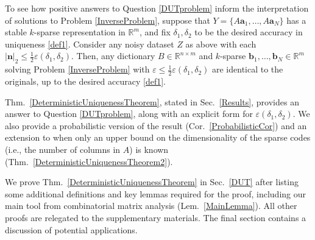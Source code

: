 \documentclass[journal, twocolumn]{IEEEtran}
\begin{document}
To see how positive answers to Question \ref{DUTproblem} inform the interpretation of solutions to Problem \ref{InverseProblem}, suppose that \mbox{$Y = \{A \mathbf{a}_1, \ldots, A\mathbf{a}_N\}$} has a stable $k$-sparse representation in $\mathbb R^m$, and fix $\delta_1, \delta_2$ to be the desired accuracy in uniqueness \eqref{def1}.  Consider any noisy dataset $Z$ as above with each $|\mathbf{n}|_2 \leq \frac{1}{2} \varepsilon(\delta_1, \delta_2)$.  Then, any  dictionary $B \in \mathbb{R}^{n \times m}$ and $k$-sparse $\mathbf{b}_1, \ldots, \mathbf{b}_N \in \mathbb{R}^m$ solving Problem \ref{InverseProblem} with $\varepsilon \leq \frac{1}{2} \varepsilon(\delta_1, \delta_2)$ are identical to the originals, up to the desired accuracy \eqref{def1}.
%
%
%
%

Thm.~\ref{DeterministicUniquenessTheorem}, stated in Sec.~\ref{Results}, provides an answer to Question \ref{DUTproblem}, along with an explicit form for $\varepsilon(\delta_1, \delta_2)$.  We also provide a probabilistic version of the result (Cor.~\ref{ProbabilisticCor}) and an extension to when only an upper bound on the dimensionality of the sparse codes (i.e., the number of columns in $A$) is known (Thm.~\ref{DeterministicUniquenessTheorem2}). 

We prove Thm.~\ref{DeterministicUniquenessTheorem} in Sec.~\ref{DUT} after listing some additional definitions and key lemmas required for the proof, including our main tool from combinatorial matrix analysis (Lem.~\ref{MainLemma}). All other proofs are relegated to the supplementary materials. The final section contains a discussion of potential applications.
\end{document}
